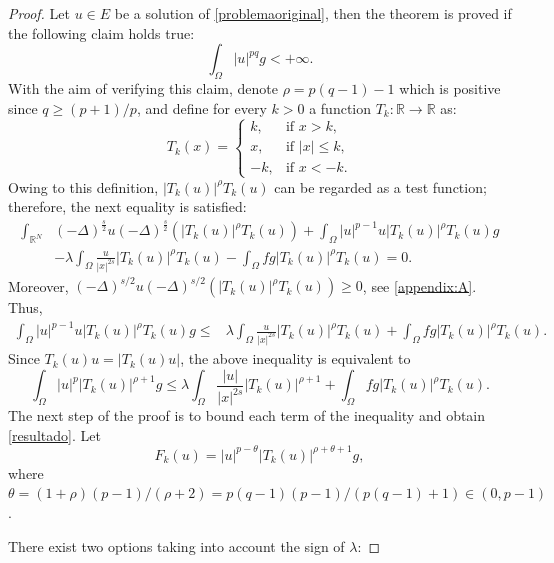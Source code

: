 \documentclass[preprint,12pt]{elsarticle}
\begin{document}
		\begin{proof}
			Let $u\in E$ be a solution of \eqref{problemaoriginal}, then the theorem is proved if the following claim holds true:
			\begin{equation}\label{resultado}
				\int_\Omega |u|^{p q}g<+\infty.
			\end{equation}	
			With the aim of verifying this claim,  denote $\rho=p(q-1)-1$ which is positive since $q\geq (p +1)/p $, and define for every $k>0$ a function $T_k:\mathbb{R}\rightarrow \mathbb{R}$ as:
			\begin{equation*} T_k(x)=
				\left\{ \begin{array}{ll}
					k, & \text{if $x>k$,} \\
					
					x, & \text{if $|x|\leq k$,} \\
					-k, & \text{if $x<-k.$} 
				\end{array}
				\right.
			\end{equation*}	
			Owing to this definition, $|T_k(u)|^{\rho}T_k(u)$ can be regarded as a test function; therefore, the next equality is satisfied:
			\begin{align*}
				\int_{\mathbb{R}^N}&(-\Delta)^{\frac{s}{2}}u(-\Delta)^{\frac{s}{2}}(|T_k(u)|^{\rho}T_k(u))+\int_{\Omega}|u|^{p -1}u|T_k(u)|^{\rho}T_k(u)g\\&
				-\lambda\int_{\Omega}\frac{u}{|x|^{2s}}|T_k(u)|^{\rho}T_k(u)-\int_{\Omega}fg|T_k(u)|^{\rho}T_k(u)=0.
			\end{align*}
			Moreover,  $(-\Delta)^{s/2}u(-\Delta)^{s/2}(|T_k(u)|^{\rho}T_k(u))\geq 0$, see \ref{appendix:A}. Thus,
			\begin{align*}
				\int_{\Omega}|u|^{p -1}u|T_k(u)|^{\rho}T_k(u)g\leq& \lambda\int_{\Omega}\frac{u}{|x|^{2s}}|T_k(u)|^{\rho}T_k(u)
				+\int_{\Omega}fg|T_k(u)|^{\rho}T_k(u).
			\end{align*}
			Since $T_k(u)u=|T_k(u)u|$, the above inequality is equivalent to
			\begin{equation}\label{exfinal}
				\int_{\Omega}|u|^{p }|T_k(u)|^{\rho+1}g\leq\lambda\int_{\Omega}\frac{|u|}{|x|^{2s}}|T_k(u)|^{\rho+1}+\int_{\Omega}fg|T_k(u)|^{\rho}T_k(u).
			\end{equation}
			The next step of the proof is to bound each term of the inequality and obtain \eqref{resultado}. Let
			\[ 
			F_k(u)=|u|^{p -\theta}|T_k(u)|^{\rho+\theta+1}g,
			\]	
			where $\theta=(1+\rho)(p -1)/(\rho+2)=p(q-1)(p-1)/(p(q-1)+1)\in (0,p-1)$.
			
			There exist two options taking into account the sign of $\lambda$:
			

\end{proof}
\end{document}
